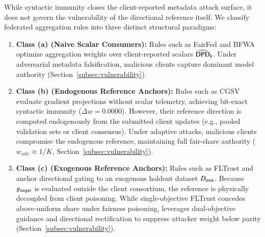 \begin{remark}
\label{rem:anchor_taxonomy}
While syntactic immunity closes the client-reported metadata attack surface, it does not govern the vulnerability of the directional reference itself. We classify federated aggregation rules into three distinct structural paradigms:
\begin{enumerate}[leftmargin=*]
    \item \textbf{Class (a) (Naive Scalar Consumers):} Rules such as FairFed and BFWA optimize aggregation weights over client-reported scalars $\widehat{\mathrm{DPD}}_k$. Under adversarial metadata falsification, malicious clients capture dominant model authority (Section~\ref{subsec:vulnerability}).
    \item \textbf{Class (b) (Endogenous Reference Anchors):} Rules such as CGSV evaluate gradient projections without scalar telemetry, achieving bit-exact syntactic immunity ($\Delta w = 0.0000$). However, their reference direction is computed endogenously from the submitted client updates (e.g., pooled validation sets or client consensus). Under adaptive attacks, malicious clients compromise the endogenous reference, maintaining full fair-share authority ($w_{\mathrm{adv}} \approx 1/K$, Section~\ref{subsec:vulnerability}).
    \item \textbf{Class (c) (Exogenous Reference Anchors):} Rules such as FLTrust and \MethodName{} anchor directional gating to an exogenous holdout dataset $D_{\mathrm{root}}$. Because $g_{\mathrm{target}}$ is evaluated outside the client consortium, the reference is physically decoupled from client poisoning. While single-objective FLTrust concedes above-uniform share under fairness poisoning, \MethodName{} leverages dual-objective guidance and directional rectification to suppress attacker weight below parity (Section~\ref{subsec:vulnerability}).
\end{enumerate}
\end{remark}

